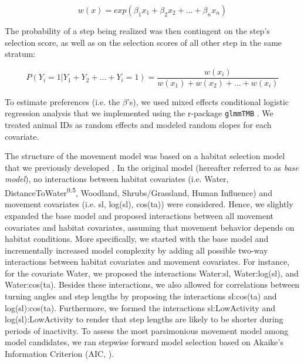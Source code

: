 \documentclass[abstract=on,10pt,a4paper,bibliography=totocnumbered]{article}
\begin{document}
\begin{equation}
\label{EQ1}
  w(x) = exp(\beta_1 x_1 + \beta_2 x_2 + ... + \beta_n x_n)
\end{equation}

The probability of a step being realized was then contingent on the step's
selection score, as well as on the selection scores of all other step in the
same stratum:

\begin{equation}
\label{EQ2}
  P(Y_{i} = 1 | Y_{1} + Y_{2} + ... + Y_{i} = 1) =
  \frac{w(x_{i})}{w(x_{1}) + w(x_{2}) + ... + w(x_{i})}
\end{equation}

\noindent To estimate preferences (i.e. the \(\beta\)'s), we used mixed effects
conditional logistic regression analysis \citep{Muff.2020} that we implemented
using the r-package {\tt glmmTMB} \citep{Brooks.2017}. We treated animal IDs as
random effects and modeled random slopes for each covariate.

The structure of the movement model was based on a habitat selection model that
we previously developed \citep{Hofmann.2021}. In the original model (hereafter
referred to as \textit{base model}), no interactions between habitat covariates
(i.e. \textsf{Water, DistanceToWater\textsuperscript{0.5}, Woodland,
Shrubs/Grassland, Human Influence}) and movement covariates (i.e. \textsf{sl,
log(sl), cos(ta)}) were considered. Hence, we slightly expanded the base model
and proposed interactions between all movement covariates and habitat
covariates, assuming that movement behavior depends on habitat conditions. More
specifically, we started with the base model and incrementally increased model
complexity by adding all possible two-way interactions between habitat
covariates and movement covariates. For instance, for the covariate
\textsf{Water}, we proposed the interactions \textsf{Water:sl},
\textsf{Water:log(sl)}, and \textsf{Water:cos(ta)}. Besides these interactions,
we also allowed for correlations between turning angles and step lengths by
proposing the interactions \textsf{sl:cos(ta)} and \textsf{log(sl):cos(ta)}.
Furthermore, we formed the interactions \textsf{sl:LowActivity} and
\textsf{log(sl):LowActivity} to render that step lengths are likely to be
shorter during periods of inactivity. To assess the most parsimonious movement
model among model candidates, we ran stepwise forward model selection based on
Akaike's Information Criterion (AIC, \citealp{Burnham.2002}).
\end{document}
